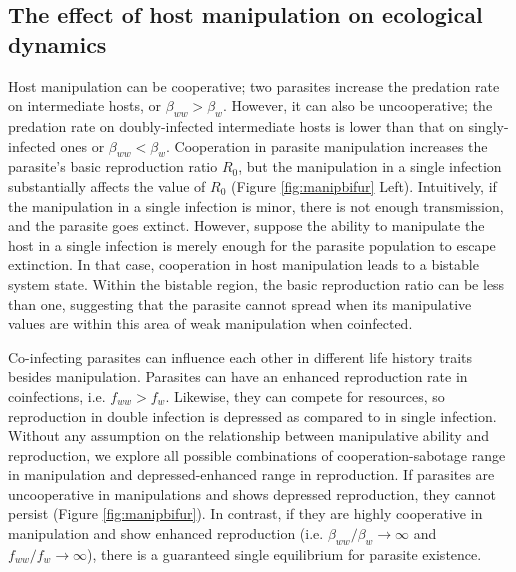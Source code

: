\documentclass[a4paper]{scrartcl}
\begin{document}
\subsection*{The effect of host manipulation on ecological dynamics}

Host manipulation can be cooperative; two parasites increase the predation rate on intermediate hosts, or $\beta_{ww} > \beta_w$. 
However, it can also be uncooperative; the predation rate on doubly-infected intermediate hosts is lower than that on singly-infected ones or $\beta_{ww} < \beta_w$.
Cooperation in parasite manipulation increases the parasite's basic reproduction ratio $R_0$, but the manipulation in a single infection substantially affects the value of $R_0$ (Figure \ref{fig:manipbifur} Left). 
Intuitively, if the manipulation in a single infection is minor, there is not enough transmission, and the parasite goes extinct.
However, suppose the ability to manipulate the host in a single infection is merely enough for the parasite population to escape extinction. 
In that case, cooperation in host manipulation leads to a bistable system state. 
Within the bistable region, the basic reproduction ratio can be less than one, suggesting that the parasite cannot spread when its manipulative values are within this area of weak manipulation when coinfected. 

Co-infecting parasites can influence each other in different life history traits besides manipulation.
Parasites can have an enhanced reproduction rate in coinfections, i.e. $f_{ww} > f_w$. 
Likewise, they can compete for resources, so reproduction in double infection is depressed as compared to in single infection. 
Without any assumption on the relationship between manipulative ability and reproduction, we explore all possible combinations of cooperation-sabotage range in manipulation and depressed-enhanced range in reproduction.
If parasites are uncooperative in manipulations and shows depressed reproduction, they cannot persist (Figure \ref{fig:manipbifur}). 
In contrast, if they are highly cooperative in manipulation and show enhanced reproduction (i.e. $\beta_{ww}/\beta_w \rightarrow \infty$ and $f_{ww}/f_w \rightarrow \infty$), there is a guaranteed single equilibrium for parasite existence. 
\end{document}
